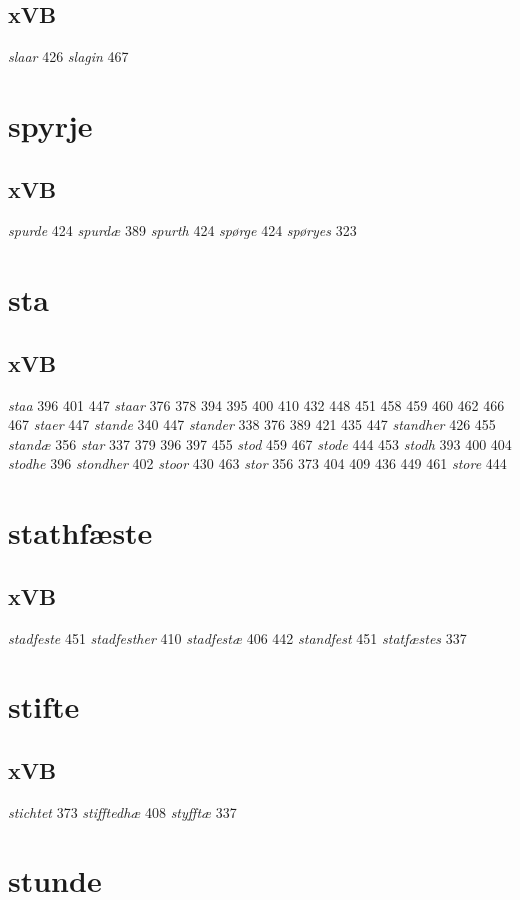\documentclass[a4paper,twocolumn]{article}
\begin{document}
\subsection{xVB}
\label{sec:org6f71fc4}
\emph{slaar} 426 \emph{slagin} 467 
\section{spyrje}
\label{sec:orga4bcd48}
\subsection{xVB}
\label{sec:org6135426}
\emph{spurde} 424 \emph{spurdæ} 389 \emph{spurth} 424 \emph{spørge} 424 \emph{spøryes} 323 
\section{sta}
\label{sec:org4e0b49f}
\subsection{xVB}
\label{sec:orgbbe5769}
\emph{staa} 396 401 447 \emph{staar} 376 378 394 395 400 410 432 448 451 458 459 460 462 466 467 \emph{staer} 447 \emph{stande} 340 447 \emph{stander} 338 376 389 421 435 447 \emph{standher} 426 455 \emph{standæ} 356 \emph{star} 337 379 396 397 455 \emph{stod} 459 467 \emph{stode} 444 453 \emph{stodh} 393 400 404 \emph{stodhe} 396 \emph{stondher} 402 \emph{stoor} 430 463 \emph{stor} 356 373 404 409 436 449 461 \emph{store} 444 
\section{stathfæste}
\label{sec:org0d2e254}
\subsection{xVB}
\label{sec:org2253659}
\emph{stadfeste} 451 \emph{stadfesther} 410 \emph{stadfestæ} 406 442 \emph{standfest} 451 \emph{statfæstes} 337 
\section{stifte}
\label{sec:org965b672}
\subsection{xVB}
\label{sec:org0cc3486}
\emph{stichtet} 373 \emph{stifftedhæ} 408 \emph{styfftæ} 337 
\section{stunde}
\label{sec:orgc07bfe4}
\end{document}
